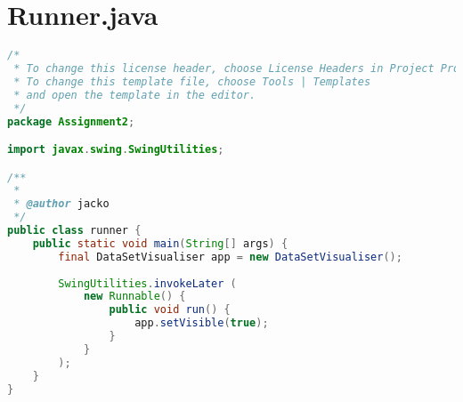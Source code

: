 \documentclass[pdftex,a4paper,10pt,titlepage]{article}
\begin{document}
\section{Runner.java}

\begin{lstlisting}[language=java, breaklines=true]
/*
 * To change this license header, choose License Headers in Project Properties.
 * To change this template file, choose Tools | Templates
 * and open the template in the editor.
 */
package Assignment2;

import javax.swing.SwingUtilities;

/**
 *
 * @author jacko
 */
public class runner {
    public static void main(String[] args) {
        final DataSetVisualiser app = new DataSetVisualiser();
        
        SwingUtilities.invokeLater (
            new Runnable() {
                public void run() {
                    app.setVisible(true);
                }
            }
        );
    }
}

\end{lstlisting}

\pagestyle{fancy}
\fancyhf{}
\cfoot{\thepage}













\end{document}
